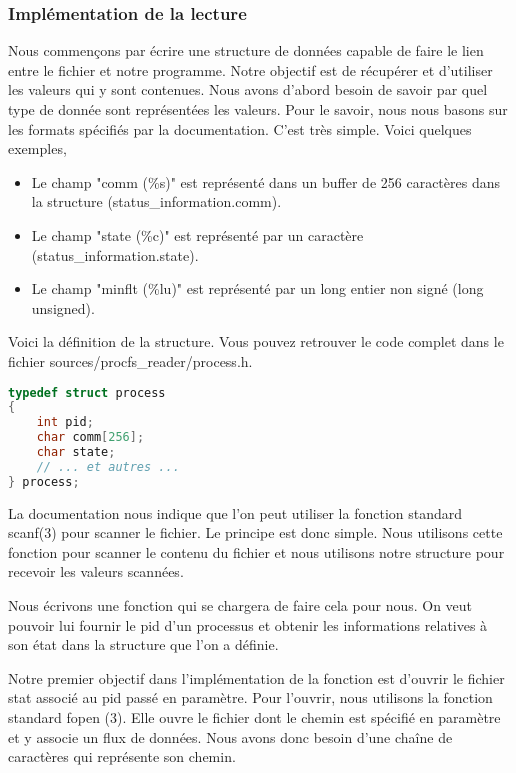 \subsubsection{Implémentation de la lecture}
Nous commençons par écrire une structure de données capable de faire le lien entre le fichier et notre programme. Notre objectif est de récupérer et d’utiliser les valeurs qui y sont contenues.
Nous avons d’abord besoin de savoir par quel type de donnée sont représentées les valeurs. Pour le savoir, nous nous basons sur les formats spécifiés par la documentation. C’est très simple. Voici quelques exemples,

\begin{itemize}
\item Le champ "comm (\%s)" est représenté dans un buffer de 256 caractères dans la structure (status\_information.comm).
\item Le champ "state (\%c)" est représenté par un caractère (status\_information.state).
\item Le champ "minflt (\%lu)" est représenté par un long entier non signé (long unsigned).
\end{itemize}

Voici la définition de la structure. Vous pouvez retrouver le code complet dans le fichier sources/procfs\_reader/process.h.

\begin{lstlisting}[frame=single, language=c]
typedef struct process
{
    int pid;
    char comm[256];
    char state;
    // ... et autres ...
} process;
\end{lstlisting}

La documentation nous indique que l’on peut utiliser la fonction standard scanf(3) pour scanner le fichier. Le principe est donc simple. Nous utilisons cette fonction pour scanner le contenu du fichier et nous utilisons notre structure pour recevoir les valeurs scannées. 

Nous écrivons une fonction qui se chargera de faire cela pour nous. On veut pouvoir lui fournir le pid d’un processus et obtenir les informations relatives à son état dans la structure que l'on a définie. 

Notre premier objectif dans l'implémentation de la fonction est d'ouvrir le fichier stat associé au pid passé en paramètre. Pour l'ouvrir, nous utilisons la fonction standard fopen (3). Elle ouvre le fichier dont le chemin est spécifié en paramètre et y associe un flux de données. Nous avons donc besoin d'une chaîne de caractères qui représente son chemin.

